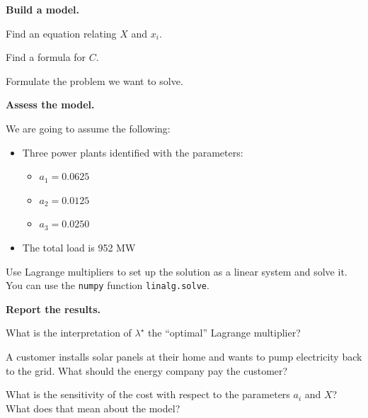 \begin{slide}

\textbf{Build a model.}

\begin{parts}
	\item Find an equation relating $X$ and $x_i$.
	\item Find a formula for $C$.
	\item Formulate the problem we want to solve.
	

\begin{slidesonly}
	\bigskip
\end{slidesonly}

\hspace{-2em}
\textbf{Assess the model.}

\hspace{-2em}
	We are going to assume the following:
	\begin{itemize}
		\item Three power plants identified with the parameters:
		\begin{itemize}
			\item $a_1 = 0.0625 $
			\item $a_2 = 0.0125 $
			\item $a_3 = 0.0250 $
		\end{itemize}
		\item The total load is 952 MW
	\end{itemize}


	\item Use Lagrange multipliers to set up the solution as a linear system and solve it. You can use the \texttt{numpy} function \texttt{linalg.solve}.

\begin{slidesonly}
	\vspace{5cm}
\end{slidesonly}

\hspace{-2em}
\textbf{Report the results.}

	\item What is the interpretation of $\lambda^\star$ the ``optimal'' Lagrange multiplier?
	
	\item A customer installs solar panels at their home and wants to pump electricity back to the grid. What should the energy company pay the customer? \\
	
	\item What is the sensitivity of the cost with respect to the parameters $a_i$ and $X$? What does that mean about the model?
		
\end{parts}
	
\end{slide}


